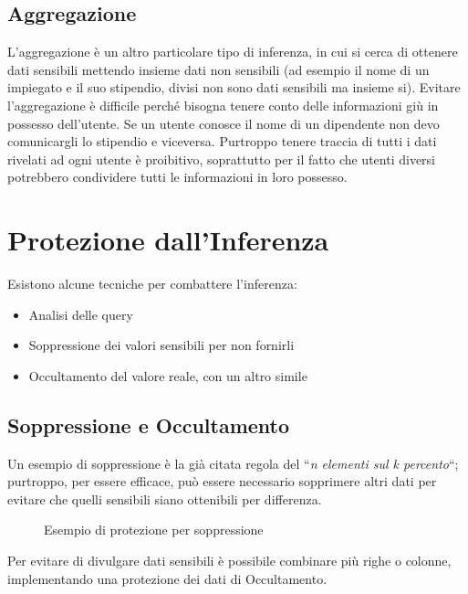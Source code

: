 \subsection{Aggregazione}
L'aggregazione è un altro particolare tipo di inferenza, in cui si cerca di ottenere dati sensibili mettendo insieme dati non sensibili (ad esempio il nome di un impiegato e il suo stipendio, divisi non sono dati sensibili ma insieme si). 
\newline
Evitare l'aggregazione è difficile perché bisogna tenere conto delle informazioni giù in possesso dell'utente. Se un utente conosce il nome di un dipendente non devo comunicargli lo stipendio e viceversa. Purtroppo tenere traccia di tutti i dati rivelati ad ogni utente è proibitivo, soprattutto per il fatto che utenti diversi potrebbero condividere tutti le informazioni in loro possesso.
\newpage
\section{Protezione dall'Inferenza}
Esistono alcune tecniche per combattere l'inferenza: 
\begin{itemize}
\item Analisi delle query
\item Soppressione dei valori sensibili per non fornirli
\item Occultamento del valore reale, con un altro simile
\end{itemize}

\subsection{Soppressione e Occultamento}
Un esempio di soppressione è la già citata regola del ``\textit{n elementi sul k percento}``; purtroppo, per essere efficace, può essere necessario sopprimere altri dati per evitare che quelli sensibili siano ottenibili per differenza.

\begin{figure}[htpb]
	\centering
		
				
		\caption{Esempio di protezione per soppressione
		  \label{fig:query_soppressione}}  

\end{figure}
Per evitare di divulgare dati sensibili è possibile combinare più righe o colonne, implementando una protezione dei dati di Occultamento.

